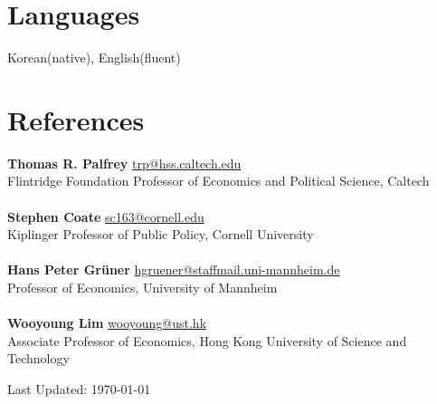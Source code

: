 \documentclass[margin, letterpaper]{res}
\begin{document}
\begin{resume}
\section{Languages} Korean(native), English(fluent)

\section{References} \textbf{Thomas R. Palfrey} \href{mailto:trp@hss.caltech.edu}{trp@hss.caltech.edu}\\
Flintridge Foundation Professor of Economics and Political Science, Caltech\\\\
\textbf{Stephen Coate} \href{mailto:sc163@cornell.edu}{sc163@cornell.edu}\\
Kiplinger Professor of Public Policy, Cornell University\\\\
\textbf{Hans Peter Gr\"{u}ner} \href{mailto:hgruener@staffmail.uni-mannheim.de}{hgruener@staffmail.uni-mannheim.de}\\
Professor of Economics, University of Mannheim\\\\
\textbf{Wooyoung Lim} \href{mailto:wooyoung@ust.hk}{wooyoung@ust.hk}\\
Associate Professor of Economics, Hong Kong University of Science and Technology
\begin{flushright}
Last Updated: \today
\end{flushright}
\end{resume} 
\end{document}
